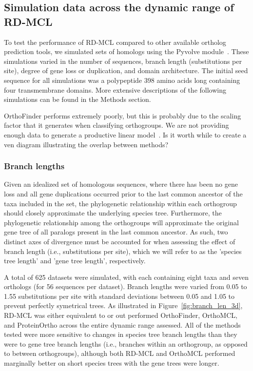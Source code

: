 \documentclass[twocolumn]{bmcart}%
\begin{document}
\subsection{Simulation data across the dynamic range of RD-MCL}\label{subsec:simulationDataAcrossTheDynamicRangeOfRd-mcl}
To test the performance of RD-MCL compared to other available ortholog prediction tools, we simulated sets of homologs using the Pyvolve module~\cite{Spielman:2015kv}.
These simulations varied in the number of sequences, branch length (substitutions per site), degree of gene loss or duplication, and domain architecture.
The initial seed sequence for all simulations was a polypeptide 398 amino acids long containing four transmembrane domains.
More extensive descriptions of the following simulations can be found in the Methods section.

OrthoFinder performs extremely poorly, but this is probably due to the scaling factor that it generates when classifying orthogroups.
We are not providing enough data to generate a productive linear model~\cite{Emms:2015ig}.
Is it worth while to create a ven diagram illustrating the overlap between methods?

\subsubsection{Branch lengths}
Given an idealized set of homologous sequences, where there has been no gene loss and all gene duplications occurred prior to the last common ancestor of the taxa included in the set, the phylogenetic relationship within each orthogroup should closely approximate the underlying species tree.
Furthermore, the phylogenetic relationship among the orthogroups will approximate the original gene tree of all paralogs present in the last common ancestor.
As such, two distinct axes of divergence must be accounted for when assessing the effect of branch length (i.e., substitutions per site), which we will refer to as the 'species tree length' and 'gene tree length', respectively.


A total of 625 datasets were simulated, with each containing eight taxa and seven orthologs (for 56 sequences per dataset).
Branch lengths were varied from 0.05 to 1.55 substitutions per site with standard deviations between 0.05 and 1.05 to prevent perfectly symetrical trees.
As illustrated in Figure~\ref{fig:branch_len_3d}, RD-MCL was either equivalent to or out performed OrthoFinder, OrthoMCL, and ProteinOrtho across the entire dynamic range assessed.
All of the methods tested were more sensitive to changes in species tree branch lengths than they were to gene tree branch lengths (i.e., branches within an orthogroup, as opposed to between orthogroups), although both RD-MCL and OrthoMCL performed marginally better on short species trees with the gene trees were longer.
\end{document}
